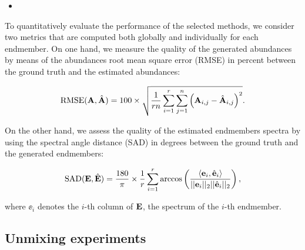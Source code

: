 \begin{itemize}
    \item {}
\end{itemize}

  
To quantitatively evaluate the performance of the selected methods, we consider two metrics that are computed both globally and individually for each endmember.
On one hand, we measure the quality of the generated abundances by means of the
abundances root mean square error (RMSE) in percent between the ground truth and the
estimated abundances:

\begin{equation} \label{eq:RMSE}
  \text{RMSE}(\mathbf A, \hat{\mathbf A}) = 100 \times \sqrt{\frac{1}{r n} \sum_{i=1}^r \sum_{j=1}^n \left( \mathbf A_{i, j} - \hat{\mathbf A}_{i, j} \right)^2}.
\end{equation}

On the other hand, we assess the quality of the estimated endmembers spectra by
using the spectral angle distance (SAD) in degrees between the ground truth and
the generated endmembers:

\begin{equation}  \label{eq:SAD}
  \text{SAD}(\mathbf E, \hat{\mathbf E}) = \frac{180}{\pi} \times \frac{1}{r} \sum_{i=1}^r \arccos \left( \frac{\langle \mathbf e_i, \hat{\mathbf e}_i \rangle}{||\mathbf e_i||_2 ||\hat{\mathbf e}_i||_2} \right),
\end{equation}

where $\ee_i$ denotes the
$i$-th column of $\mathbf E$, \ie the spectrum of the $i$-th endmember.

\subsection{Unmixing experiments}

\begin{table}[h]
  \centering
    
  \label{table:sim}
\end{table}


